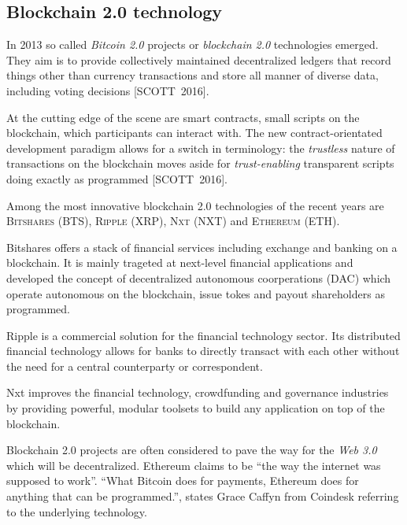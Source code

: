 \subsection{Blockchain 2.0 technology}
In 2013 so called \textit{Bitcoin 2.0} projects or \textit{blockchain 2.0} technologies emerged. They aim is to provide collectively maintained decentralized ledgers that record things other than currency transactions and store all manner of diverse data, including voting decisions [SCOTT~2016].\par
At the cutting edge of the scene are smart contracts, small scripts on the blockchain, which participants can interact with. The new contract-orientated development paradigm allows for a switch in terminology: the \textit{trustless} nature of transactions on the blockchain moves aside for \textit{trust-enabling} transparent scripts doing exactly as programmed [SCOTT~2016].\par
Among the most innovative blockchain 2.0 technologies of the recent years are \textsc{Bitshares (BTS)}, \textsc{Ripple (XRP)}, \textsc{Nxt (NXT)} and \textsc{Ethereum (ETH)}.\par %
Bitshares offers a stack of financial services including exchange and banking on a blockchain. It is mainly trageted at next-level financial applications and developed the concept of decentralized autonomous coorperations (\textsc{DAC}) which operate autonomous on the blockchain, issue tokes and payout shareholders as programmed.\par
Ripple is a commercial solution for the financial technology sector. Its distributed financial technology allows for banks to directly transact with each other without the need for a central counterparty or correspondent.\par
Nxt improves the financial technology, crowdfunding and governance industries by providing powerful, modular toolsets to build any application on top of the blockchain.\par
Blockchain 2.0 projects are often considered to pave the way for the \textit{Web 3.0} which will be decentralized. Ethereum claims to be \enquote{the way the internet was supposed to work}. \enquote{What Bitcoin does for payments, Ethereum does for anything that can be programmed.}, states Grace Caffyn from Coindesk referring to the underlying technology.\par
